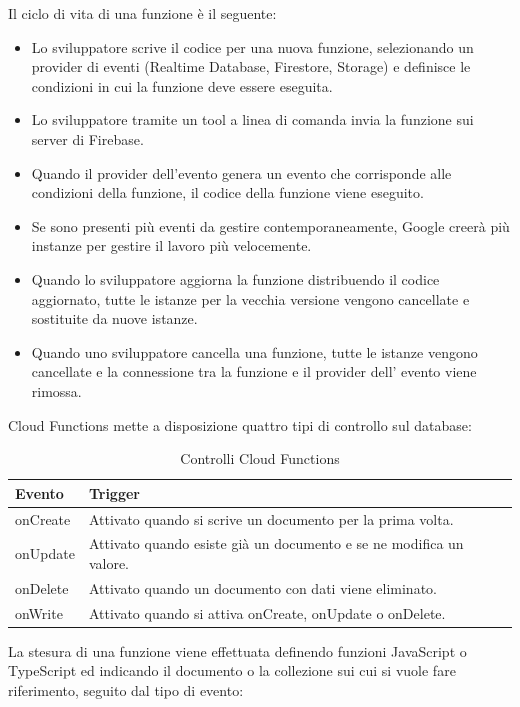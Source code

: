 Il ciclo di vita di una funzione è il seguente:
\begin{itemize}
  \item Lo sviluppatore scrive il codice per una nuova funzione, selezionando un provider di eventi (Realtime Database, Firestore, Storage) e definisce le condizioni in cui la funzione deve essere eseguita.
  \item Lo sviluppatore tramite un tool a linea di comanda invia la funzione sui server di Firebase.
  \item Quando il provider dell'evento genera un evento che corrisponde alle condizioni della funzione, il codice della funzione viene eseguito.
  \item Se sono presenti più eventi da gestire contemporaneamente, Google creerà più instanze per gestire il lavoro più velocemente.
  \item Quando lo sviluppatore aggiorna la funzione distribuendo il codice aggiornato, tutte le istanze per la vecchia versione vengono cancellate e sostituite da nuove istanze.
  \item Quando uno sviluppatore cancella una funzione, tutte le istanze vengono cancellate e la connessione tra la funzione e il provider dell' evento viene rimossa.
\end{itemize}


Cloud Functions mette a disposizione quattro tipi di controllo sul database:

\begin{table}[h!]
\begin{tabular}{|p{2cm}|p{12cm}|}
    \hline
    \textbf{Evento} & \textbf{Trigger} \\ \hline
    onCreate & Attivato quando si scrive un documento per la prima volta.\\ \hline
    onUpdate & Attivato quando esiste già un documento e se ne modifica un valore.\\ \hline
    onDelete & Attivato quando un documento con dati viene eliminato.\\ \hline
    onWrite & Attivato quando si attiva onCreate, onUpdate o onDelete.\\ \hline

\end{tabular}
\caption[Firestore Rules]{Controlli Cloud Functions}\label{tab:Controlli Cloud Functions}
\end{table}

La stesura di una funzione viene effettuata definendo funzioni JavaScript o TypeScript ed indicando il documento o la collezione sui cui si vuole fare riferimento, seguito dal tipo di evento:


